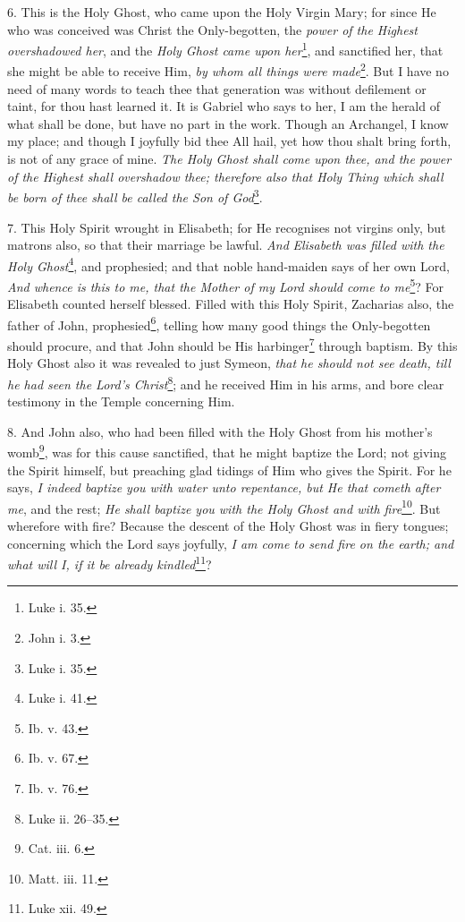 6. This is the Holy Ghost, who came upon the Holy Virgin Mary; for since He who was conceived was Christ the Only-begotten, the \emph{power of the Highest overshadowed her}, and the \emph{Holy Ghost came upon her}\footnote{Luke i. 35.}, and sanctified her, that she might be able to receive Him, \emph{by whom all things were made}\footnote{John i. 3.}. But I have no need of many words to teach thee that generation was without defilement or taint, for thou hast learned it. It is Gabriel who says to her, I am the herald of what shall be done, but have no part in the work. Though an Archangel, I know my place; and though I joyfully bid thee All hail, yet how thou shalt bring forth, is not of any grace of mine. \emph{The Holy Ghost shall come upon thee, and the power of the Highest shall overshadow thee; therefore also that Holy Thing which shall be born of thee shall be called the Son of God}\footnote{Luke i. 35.}.

7. This Holy Spirit wrought in Elisabeth; for He recognises not virgins only, but matrons also, so that their marriage be lawful. \emph{And} \emph{Elisabeth was filled with the Holy Ghost}\footnote{Luke i. 41.}, and prophesied; and that noble hand-maiden says of her own Lord, \emph{And whence is this to me, that the Mother of my Lord should come to me}\footnote{Ib. v. 43.}? For Elisabeth counted herself blessed. Filled with this Holy Spirit, Zacharias also, the father of John, prophesied\footnote{Ib. v. 67.}, telling how many good things the Only-begotten should procure, and that John should be His harbinger\footnote{Ib. v. 76.} through baptism. By this Holy Ghost also it was revealed to just Symeon, \emph{that he should not see death, till he had seen the Lord’s Christ}\footnote{Luke ii. 26–35.}; and he received Him in his arms, and bore clear testimony in the Temple concerning Him.

8. And John also, who had been filled with the Holy Ghost from his mother’s womb\footnote{Cat. iii. 6.}, was for this cause sanctified, that he might baptize the Lord; not giving the Spirit himself, but preaching glad tidings of Him who gives the Spirit. For he says, \emph{I indeed baptize you with water unto repentance, but He that cometh after me}, and the rest; \emph{He shall baptize you with the Holy Ghost and with fire}\footnote{Matt. iii. 11.}. But wherefore with fire? Because the descent of the Holy Ghost was in fiery tongues; concerning which the Lord says joyfully, \emph{I am come to send fire on the earth; and what will I, if it be already kindled}\footnote{Luke xii. 49.}?


